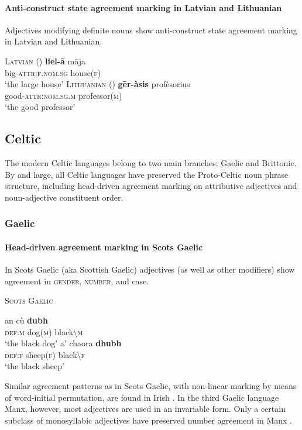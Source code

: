 \paragraph{Anti-construct state agreement marking in Latvian and Lithuanian}
Adjectives modifying definite nouns show anti-construct state agreement marking in Latvian and Lithuanian.
\begin{exe}
\ex 
\begin{xlist}	
\ex	\textsc{Latvian} (\citealt[115]{dahl2007})
\gll 	\textbf{liel-ā} māja\\
	big-\textsc{attr:f.nom.sg} house(\textsc{f})\\
\glt	‘the large house’
\ex \textsc{Lithuanian} (\citealt[13]{bechert1993})
\gll 	\textbf{gēr-àsis}		profèsorius\\
	good-\textsc{attr:nom.sg.m}	professor(\textsc{m})\\
\glt	‘the good professor’
\end{xlist}
\end{exe}

\subsection{Celtic}
The modern Celtic languages belong to two main branches: Gaelic and Brittonic. By and large, all Celtic languages have preserved the Proto-Celtic noun phrase structure, including head-driven agreement marking on attributive adjectives and noun-adjective constituent order.

\subsubsection{Gaelic}
\paragraph{Head-driven agreement marking in Scots Gaelic} 
In Scots Gaelic (aka Scottish Gaelic) adjectives (as well as other modifiers) show agreement in \textsc{gender, number}, and {\sc case}.
\begin{exe}
\ex \textsc{Scots Gaelic} \cite[201]{macauley1992}
\begin{xlist}
\ex
\gll	an cù \textbf{dubh}\\
	\textsc{def:m} dog(\textsc{m}) black\textbackslash\textsc{m}\\
\glt	‘the black dog’
\ex
\gll	a' chaora \textbf{dhubh}\\
	\textsc{def:f} sheep(\textsc{f}) black\textbackslash\textsc{f}\\
\glt	‘the black sheep’
\end{xlist}
\end{exe}
Similar agreement patterns as in Scots Gaelic, with non-linear marking by means of word-initial permutation, are found in Irish \cite[73, 97]{odochartaigh1992}. In the third Gaelic language Manx, however, most adjectives are used in an invariable form. Only a certain subclass of monosyllabic adjectives have preserved number agreement in Manx \cite[127]{thomsen1992}.

